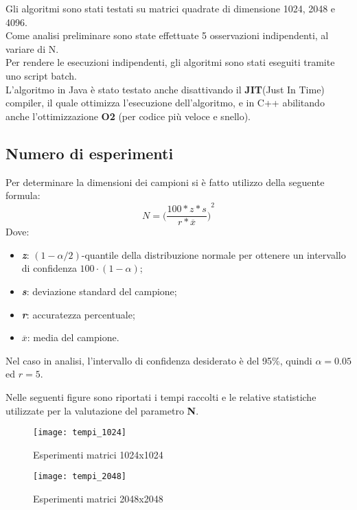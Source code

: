 Gli algoritmi sono stati testati su matrici quadrate di dimensione 1024, 2048 e 4096.\\
Come analisi preliminare sono state effettuate 5 osservazioni indipendenti, al variare di N.\\
Per rendere le esecuzioni indipendenti, gli algoritmi sono stati eseguiti tramite uno
script batch.\\
L'algoritmo in Java è stato testato anche disattivando il \textbf{JIT}(Just In Time)
compiler, il quale ottimizza l'esecuzione dell'algoritmo, e in C++ abilitando anche
l'ottimizzazione \textbf{O2} (per codice più veloce e snello).\\

\subsection{Numero di esperimenti}

Per determinare la dimensioni dei campioni si è fatto utilizzo della seguente formula:
$$N= {\biggl({{\frac{100*z*s}{r*\overline{x}}}\biggr)}^2}$$
Dove:
\begin{itemize}
  \item \textbf{\textit{z}}: $(1-{\alpha / 2})$-quantile della distribuzione normale
  per ottenere un intervallo di confidenza $100\cdot(1-\alpha)$;
  \item \textbf{\textit{s}}: deviazione standard del campione;
  \item \textbf{\textit{r}}: accuratezza percentuale;
  \item \textbf{{$\overline{\textit{x}}$}}: media del campione.
\end{itemize}

Nel caso in analisi, l'intervallo di confidenza desiderato è del 95\%, quindi
$\alpha = 0.05$ ed $ r = 5 $.

Nelle seguenti figure sono riportati i tempi raccolti e le relative statistiche
utilizzate per la valutazione del parametro \textbf{N}.
\begin{figure}[!htbp]
  \texttt{[image: tempi\_1024]}
  \caption{Esperimenti matrici 1024x1024}
  \label{prodottomatrici_tempi_1024}
\end{figure}

\begin{figure}[!htbp]
  \texttt{[image: tempi\_2048]}
  \caption{Esperimenti matrici 2048x2048}
  \label{prodottomatrici_tempi_2048}
\end{figure}

